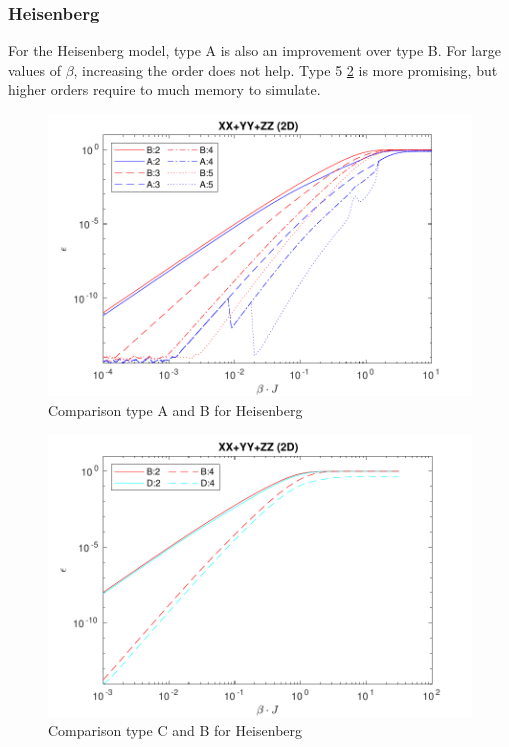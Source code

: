 \subsubsection{Heisenberg}

For the Heisenberg model, type A is also an improvement over type B. For large values of $\beta$, increasing the order does not help. Type 5 \cref{bench:type5heis} is more promising, but higher orders require to much memory to simulate.

\begin{figure}[H]
    \center
    \includegraphics[width=\textwidth]{Figuren/benchmarking/heis_XXX.pdf}
    \caption{Comparison type A and B for Heisenberg}
    \label{fig:benchmark:Heisenberg}
\end{figure}

\begin{figure}[H]
    \center
    \includegraphics[width=\textwidth]{Figuren/benchmarking/type5/heis.pdf}
    \caption{Comparison type C and B for Heisenberg}
    \label{bench:type5heis}
\end{figure}

